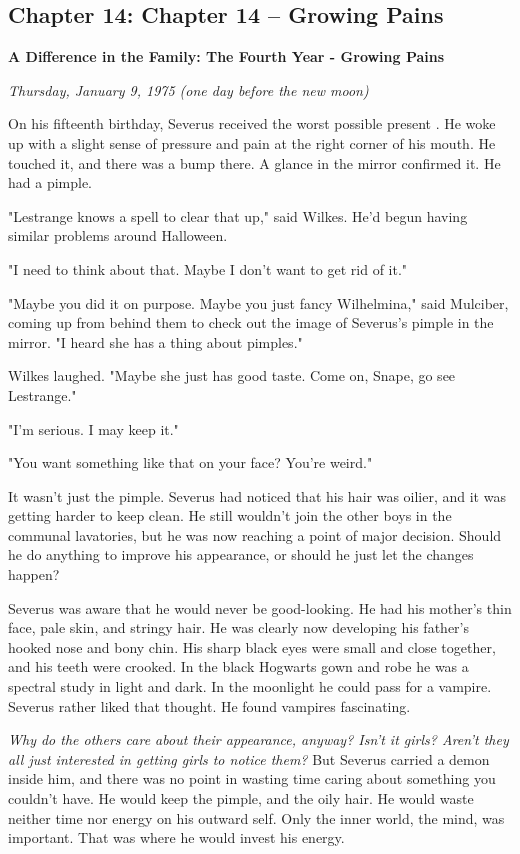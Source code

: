 \documentclass[a4paper,11pt]{article}
\begin{document}
\subsection{Chapter 14: Chapter 14 – Growing Pains}

\textbf{A Difference in the Family: The Fourth Year - Growing Pains}

\emph{Thursday, January 9, 1975 (one day before the new moon)}

On his fifteenth birthday, Severus received the worst possible present . He woke up with a slight sense of pressure and pain at the right corner of his mouth. He touched it, and there was a bump there. A glance in the mirror confirmed it. He had a pimple.

"Lestrange knows a spell to clear that up," said Wilkes. He'd begun having similar problems around Halloween.

"I need to think about that. Maybe I don't want to get rid of it."

"Maybe you did it on purpose. Maybe you just fancy Wilhelmina," said Mulciber, coming up from behind them to check out the image of Severus's pimple in the mirror. "I heard she has a thing about pimples."

Wilkes laughed. "Maybe she just has good taste. Come on, Snape, go see Lestrange."

"I'm serious. I may keep it."

"You want something like that on your face? You're weird."

It wasn't just the pimple. Severus had noticed that his hair was oilier, and it was getting harder to keep clean. He still wouldn't join the other boys in the communal lavatories, but he was now reaching a point of major decision. Should he do anything to improve his appearance, or should he just let the changes happen?

Severus was aware that he would never be good-looking. He had his mother's thin face, pale skin, and stringy hair. He was clearly now developing his father's hooked nose and bony chin. His sharp black eyes were small and close together, and his teeth were crooked. In the black Hogwarts gown and robe he was a spectral study in light and dark. In the moonlight he could pass for a vampire. Severus rather liked that thought. He found vampires fascinating.

\emph{Why do the others care about their appearance, anyway? Isn't it girls? Aren't they all just interested in getting girls to notice them?} But Severus carried a demon inside him, and there was no point in wasting time caring about something you couldn't have. He would keep the pimple, and the oily hair. He would waste neither time nor energy on his outward self. Only the inner world, the mind, was important. That was where he would invest his energy.
\end{document}
